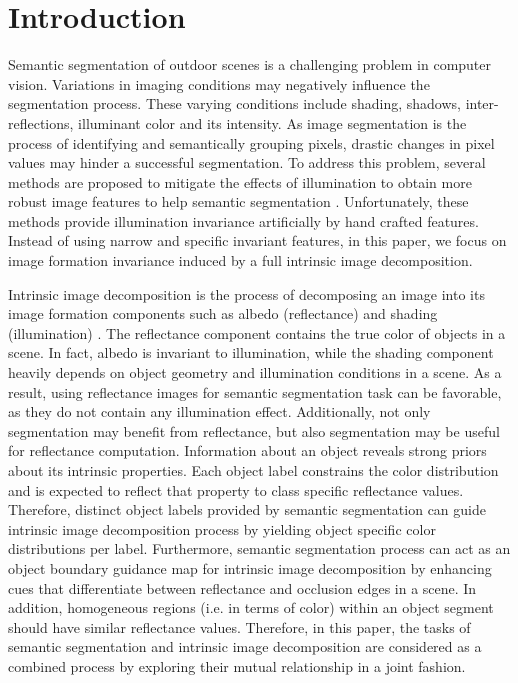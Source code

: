 \documentclass[runningheads]{llncs}
\begin{document}
\section{Introduction}
Semantic segmentation of outdoor scenes is a challenging problem in computer vision. Variations in imaging conditions may negatively influence the segmentation process. These varying conditions include shading, shadows, inter-reflections, illuminant color and its intensity. As image segmentation is the process of identifying and semantically grouping pixels, drastic changes in pixel values may hinder a successful segmentation. To address this problem, several methods are proposed to mitigate the effects of illumination to obtain more robust image features to help semantic segmentation \cite{upcroft,wang,suh,ramakrishnan}. Unfortunately, these methods provide illumination invariance artificially by hand crafted features. Instead of using narrow and specific invariant features, in this paper, we focus on image formation invariance induced by a full intrinsic image decomposition.

Intrinsic image decomposition is the process of decomposing an image into its image formation components such as albedo (reflectance) and shading (illumination) \cite{land}. The reflectance component contains the true color of objects in a scene. In fact, albedo is invariant to illumination, while the shading component heavily depends on object geometry and illumination conditions in a scene. As a result, using reflectance images for semantic segmentation task can be favorable, as they do not contain any illumination effect. Additionally, not only segmentation may benefit from reflectance, but also segmentation may be useful for reflectance computation. Information about an object reveals strong priors about its intrinsic properties. Each object label constrains the color distribution and is expected to reflect that property to class specific reflectance values. Therefore, distinct object labels provided by semantic segmentation can guide intrinsic image decomposition process by yielding object specific color distributions per label. Furthermore, semantic segmentation process can act as an object boundary guidance map for intrinsic image decomposition by enhancing cues that differentiate between reflectance and occlusion edges in a scene. In addition, homogeneous regions (i.e. in terms of color) within an object segment should have similar reflectance values. Therefore, in this paper, the tasks of semantic segmentation and intrinsic image decomposition are considered as a combined process by exploring their mutual relationship in a joint fashion. 
\end{document}

